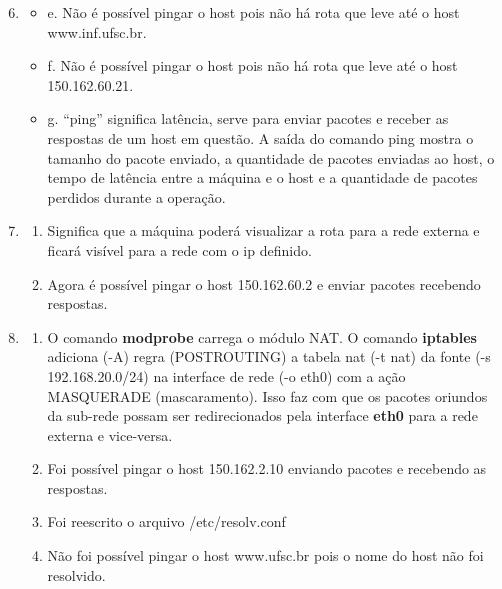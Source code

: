 \documentclass[a4paper, 12pt]{article}
\begin{document}
\begin{enumerate}
  \setcounter{enumi}{5}

\item 
\begin{itemize}

  \item{e.} Não é possível pingar o host pois não há rota que leve até
    o host www.inf.ufsc.br.
  \item{f.} Não é possível pingar o host pois não há rota que leve até
    o host 150.162.60.21.
  \item{g.} ``ping'' significa latência, serve para enviar pacotes e
    receber as respostas de um host em questão. A saída do comando
    ping mostra o tamanho do pacote enviado, a quantidade de pacotes
    enviadas ao host, o tempo de latência entre a máquina e o host e a
    quantidade de pacotes perdidos durante a operação.

\end{itemize}

\item
\begin{enumerate}

\item Significa que a máquina poderá visualizar a rota para a rede
  externa e ficará visível para a rede com o ip definido.

\item Agora é possível pingar o host 150.162.60.2 e enviar pacotes
  recebendo respostas.

\end{enumerate}

\item
\begin{enumerate}

\item O comando {\bf modprobe} carrega o módulo NAT. O comando {\bf
    iptables} adiciona (-A) regra (POSTROUTING) a tabela nat (-t nat)
  da fonte (-s 192.168.20.0/24) na interface de rede (-o eth0) com a
  ação MASQUERADE (mascaramento). Isso faz com que os pacotes oriundos
  da sub-rede possam ser redirecionados pela interface {\bf eth0} para
  a rede externa e vice-versa.

\item Foi possível pingar o host 150.162.2.10 enviando pacotes e
  recebendo as respostas.

\item Foi reescrito o arquivo /etc/resolv.conf

\item Não foi possível pingar o host www.ufsc.br pois o nome do host
  não foi resolvido.


\end{enumerate}
\end{enumerate}
\end{document}
